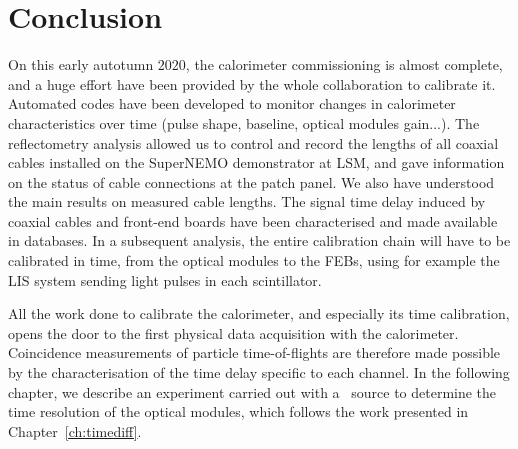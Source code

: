 \section{Conclusion}

On this early autotumn $2020$, the calorimeter commissioning is almost complete, and a huge effort have been provided by the whole collaboration to calibrate it.
Automated codes have been developed to monitor changes in calorimeter characteristics over time (pulse shape, baseline, optical modules gain...).
The reflectometry analysis allowed us to control and record the lengths of all coaxial cables installed on the SuperNEMO demonstrator at LSM, and gave information on the status of cable connections at the patch panel.
We also have understood the main results on measured cable lengths.
The signal time delay induced by coaxial cables and front-end boards have been characterised and made available in databases.
In a subsequent analysis, the entire calibration chain will have to be calibrated in time, from the optical modules to the FEBs, using for example the LIS system sending light pulses in each scintillator.

All the work done to calibrate the calorimeter, and especially its time calibration, opens the door to the first physical data acquisition with the calorimeter.
Coincidence measurements of particle time-of-flights are therefore made possible by the characterisation of the time delay specific to each channel.
In the following chapter, we describe an experiment carried out with a \Co\ source to determine the time resolution of the optical modules, which follows the work presented in Chapter~\ref{ch:timediff}.
